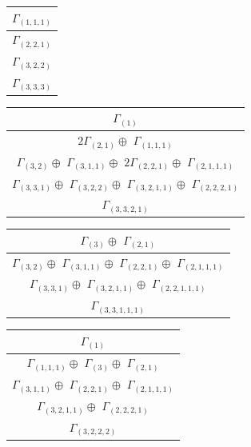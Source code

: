\documentclass[main.tex]{subfiles}
\begin{document}
\begin{minipage}{.3\textwidth}
\centering
\begin{tabular}{c}
$\Gamma_{(
1 , 
1 , 
1
)}$
\\ \hline
$\Gamma_{(
2 , 
2 , 
1
)}$
\\ \hline
$\Gamma_{(
3 , 
2 , 
2
)}$
\\ \hline
$\Gamma_{(
3 , 
3 , 
3
)}$
\\
\end{tabular}\end{minipage}
\begin{minipage}{.4\textwidth}
\centering
\begin{tabular}{c}
$\Gamma_{(
1
)}$
\\ \hline
$2\Gamma_{(
2 , 
1
)} \oplus$
$\Gamma_{(
1 , 
1 , 
1
)}$
\\ \hline
$\Gamma_{(
3 , 
2
)} \oplus$
$\Gamma_{(
3 , 
1 , 
1
)} \oplus$
$2\Gamma_{(
2 , 
2 , 
1
)} \oplus$
$\Gamma_{(
2 , 
1 , 
1 , 
1
)}$
\\ \hline
$\Gamma_{(
3 , 
3 , 
1
)} \oplus$
$\Gamma_{(
3 , 
2 , 
2
)} \oplus$
$\Gamma_{(
3 , 
2 , 
1 , 
1
)} \oplus$
$\Gamma_{(
2 , 
2 , 
2 , 
1
)}$
\\ \hline
$\Gamma_{(
3 , 
3 , 
2 , 
1
)}$
\\
\end{tabular}\end{minipage}
\bigskip
\begin{minipage}{.5\textwidth}
\centering
\begin{tabular}{c}
$\Gamma_{(
3
)} \oplus$
$\Gamma_{(
2 , 
1
)}$
\\ \hline
$\Gamma_{(
3 , 
2
)} \oplus$
$\Gamma_{(
3 , 
1 , 
1
)} \oplus$
$\Gamma_{(
2 , 
2 , 
1
)} \oplus$
$\Gamma_{(
2 , 
1 , 
1 , 
1
)}$
\\ \hline
$\Gamma_{(
3 , 
3 , 
1
)} \oplus$
$\Gamma_{(
3 , 
2 , 
1 , 
1
)} \oplus$
$\Gamma_{(
2 , 
2 , 
1 , 
1 , 
1
)}$
\\ \hline
$\Gamma_{(
3 , 
3 , 
1 , 
1 , 
1
)}$
\\
\end{tabular}\end{minipage}
\begin{minipage}{.5\textwidth}
\centering
\begin{tabular}{c}
$\Gamma_{(
1
)}$
\\ \hline
$\Gamma_{(
1 , 
1 , 
1
)} \oplus$
$\Gamma_{(
3
)} \oplus$
$\Gamma_{(
2 , 
1
)}$
\\ \hline
$\Gamma_{(
3 , 
1 , 
1
)} \oplus$
$\Gamma_{(
2 , 
2 , 
1
)} \oplus$
$\Gamma_{(
2 , 
1 , 
1 , 
1
)}$
\\ \hline
$\Gamma_{(
3 , 
2 , 
1 , 
1
)} \oplus$
$\Gamma_{(
2 , 
2 , 
2 , 
1
)}$
\\ \hline
$\Gamma_{(
3 , 
2 , 
2 , 
2
)}$
\\
\end{tabular}\end{minipage}
\end{document}
